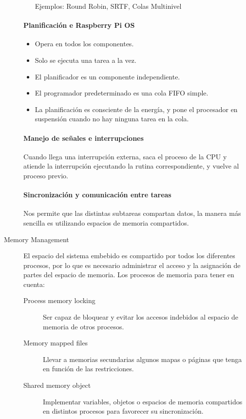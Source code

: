 \documentclass[12pt, twoside, openright]{report} %
\begin{document}
\begin{description}
\begin{itemize}
		            Ejemplos: Round Robin, SRTF, Colas Multinivel
	      \end{itemize}

	      \paragraph{Planificación e Raspberry Pi OS}
	      \begin{itemize}
		      \item Opera en todos los componentes.
		      \item Solo se ejecuta una tarea a la vez.
		      \item El planificador es un componente independiente.
		      \item El programador predeterminado es una cola FIFO simple.
		      \item La planificación es consciente de la energía, y pone el procesador en suspensión cuando no hay ninguna tarea en la cola.
	      \end{itemize}

	      \paragraph{Manejo de señales e interrupciones} Cuando llega una interrupción externa, saca el proceso de la CPU y atiende la interrupción ejecutando la rutina correspondiente, y vuelve al proceso previo.

	      \paragraph{Sincronización y comunicación entre tareas} Nos permite que las distintas subtareas compartan datos, la manera más sencilla es utilizando espacios de memoria compartidos.

	\item[Memory Management] El espacio del sistema embebido es compartido por todos los diferentes procesos, por lo que es necesario administrar el acceso y la asignación de partes del espacio de memoria. Los procesos de memoria para tener en cuenta:
	      \begin{description}
		      \item[Process memory locking] Ser capaz de bloquear y evitar los accesos indebidos al espacio de memoria de otros procesos.
		      \item[Memory mapped files] Llevar a memorias secundarias algunos mapas o páginas que tenga en función de las restricciones.
		      \item[Shared memory object] Implementar variables, objetos o espacios de memoria compartidos en distintos procesos para favorecer su sincronización.
	      \end{description}


\end{description}
\end{document}
